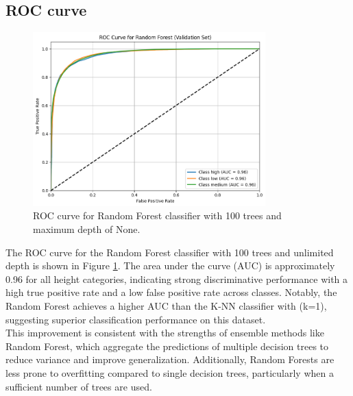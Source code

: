 \documentclass[12pt]{article}
\begin{document}
\vspace{20pt}

\subsection{ROC curve}
\noindent

\begin{figure}[H]
\centering
\includegraphics[width=0.8\textwidth]{figures/rf_roc_curve.png}
\caption{ROC curve for Random Forest classifier with 100 trees and maximum depth of None.}
\label{fig:rf_roc_curve}
\end{figure}

The ROC curve for the Random Forest classifier with 100 trees and unlimited depth is shown in Figure \ref{fig:rf_roc_curve}. The area under the curve (AUC) is approximately 0.96 for all height categories, indicating strong discriminative performance with a high true positive rate and a low false positive rate across classes. Notably, the Random Forest achieves a higher AUC than the K-NN classifier with (k=1), suggesting superior classification performance on this dataset. 
\\
This improvement is consistent with the strengths of ensemble methods like Random Forest, which aggregate the predictions of multiple decision trees to reduce variance and improve generalization. Additionally, Random Forests are less prone to overfitting compared to single decision trees, particularly when a sufficient number of trees are used.

\vspace{20pt}
\end{document}
